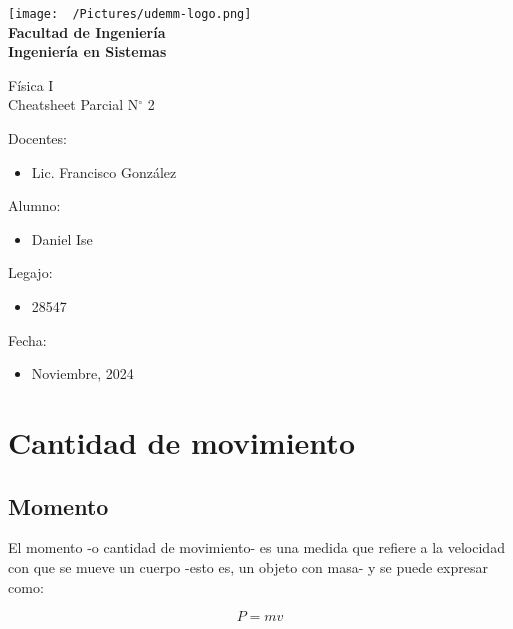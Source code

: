 \documentclass[12pt]{article}
\begin{document}
\thispagestyle{empty}

\begin{center}
	\vspace*{.5cm}
	\texttt{[image: ~/Pictures/udemm-logo.png]}\\
	\vspace{.2cm}
	\Large
	\textbf{Facultad de Ingeniería}\\
	\textbf{Ingeniería en Sistemas}\\
	\vspace{2cm}

	\Huge
	Física I\\
	Cheatsheet Parcial N\(^\circ\) 2\\
	\vfill

	\raggedright
	\Large
	Docentes:
	\begin{itemize}
		\item[] Lic. Francisco González \\
	\end{itemize}
	Alumno:
	\begin{itemize}
		\item[] Daniel Ise
	\end{itemize}
	Legajo:
	\begin{itemize}
		\item[] 28547
	\end{itemize}
	Fecha:
	\begin{itemize}
		\item[] Noviembre, 2024
	\end{itemize}
\end{center}

\pagebreak

\tableofcontents



\pagebreak

\section{Cantidad de movimiento}

\subsection{Momento}

El momento -o cantidad de movimiento-
es una medida que refiere a la velocidad con que se mueve un cuerpo
-esto es,
un objeto con masa-
y se puede expresar como:

\begin{equation}
	P = mv
\end{equation}
\end{document}
